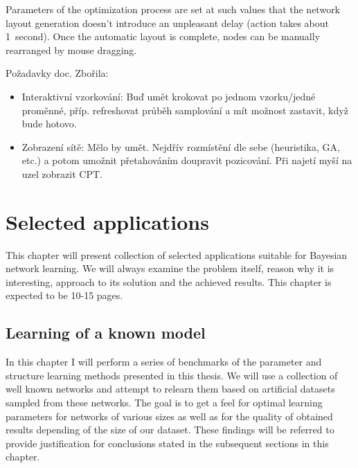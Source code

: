 \documentclass[english,cover]{fitthesis} %
\newcommand{\todo}[1]{{\color{red}#1}}
\begin{document}
Parameters of the optimization process are set at such values that the network layout generation doesn't introduce an unpleasant delay (action takes about 1~second). Once the automatic layout is complete, nodes can be manually rearranged by mouse dragging.


\todo{
Požadavky doc. Zbořila:
\begin{itemize}
	\item Interaktivní vzorkování: Buď umět krokovat po jednom vzorku/jedné proměnné, příp. refreshovat průběh samplování a mít možnost zastavit, když bude hotovo.
	\item Zobrazení sítě: Mělo by umět. Nejdřív rozmístění dle sebe (heuristika, GA, etc.) a potom umožnit přetahováním doupravit pozicování. Při najetí myší na uzel zobrazit CPT.
\end{itemize}
}





















\chapter{Selected applications}
This chapter will present collection of selected applications suitable for Bayesian network learning. We will always examine the problem itself, reason why it is interesting, approach to its solution and the achieved results. \todo{This chapter is expected to be 10-15 pages.}

\section{Learning of a known model}
In this chapter I will perform a series of benchmarks of the parameter and structure learning methods presented in this thesis. We will use a collection of well known networks and attempt to relearn them based on artificial datasets sampled from these networks. The goal is to get a feel for optimal learning parameters for networks of various sizes as well as for the quality of obtained results depending of the size of our dataset. These findings will be referred to provide justification for conclusions stated in the subsequent sections in this chapter.
\end{document}
